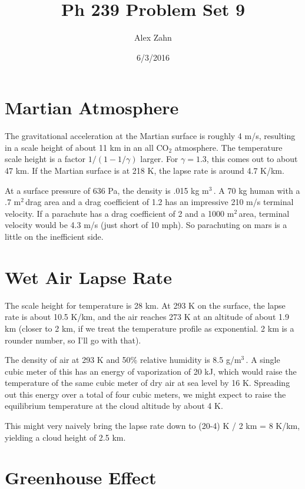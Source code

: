 \documentclass[12pt]{article}
\title{Ph 239 Problem Set 9}
\author{Alex Zahn}
\date{6/3/2016}
\begin{document}
\maketitle

\newcommand{\wmsq}{W/\(\mathrm{m}^2\,\)}
\newcommand{\msq}{\(\mathrm{m}^2\,\)}
\newcommand{\micron}{\(\mu\mathrm{m}\)\,}
\newcommand{\mcb}{\(\mathrm{m}^3\,\)}

\section{Martian Atmosphere}

The gravitational acceleration at the Martian surface is roughly 4 m/s, resulting in a scale height of about 11 km in an all CO\(_2\) atmosphere. The temperature scale height is a factor \(1/(1-1/\gamma)\) larger. For \(\gamma = 1.3\), this comes out to about 47 km. If the Martian surface is at 218 K, the lapse rate is around 4.7 K/km.

At a surface pressure of 636 Pa, the density is .015 kg \mcb. A 70 kg human with a .7 \msq drag area and a drag coefficient of 1.2 has an impressive 210 m/s terminal velocity. If a parachute has a drag coefficient of 2 and a 1000 \msq area, terminal velocity would be 4.3 m/s (just short of 10 mph). So parachuting on mars is a little on the inefficient side.

\section{Wet Air Lapse Rate}

The scale height for temperature is 28 km. At 293 K on the surface, the lapse rate is about 10.5 K/km, and the air reaches 273 K at an altitude of about 1.9 km (closer to 2 km, if we treat the temperature profile as exponential. 2 km is a rounder number, so I'll go with that).

The density of air at 293 K and 50\% relative humidity is 8.5 g/\mcb. A single cubic meter of this has an energy of vaporization of 20 kJ, which would raise the temperature of the same cubic meter of dry air at sea level by 16 K. Spreading out this energy over a total of four cubic meters, we might expect to raise the equilibrium temperature at the cloud altitude by about 4 K.

This might very naively bring the lapse rate down to (20-4) K / 2 km = 8 K/km, yielding a cloud height of 2.5 km.


\section{Greenhouse Effect}
\end{document}
